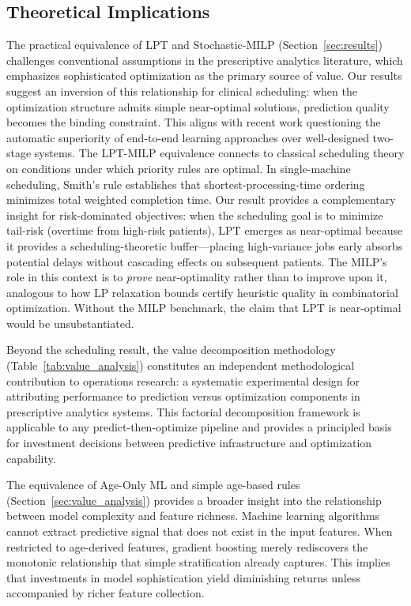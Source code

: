 \documentclass[11pt,a4paper]{article}
\begin{document}
\subsection{Theoretical Implications}

The practical equivalence of LPT and Stochastic-MILP (Section~\ref{sec:results}) challenges conventional assumptions in the prescriptive analytics literature, which emphasizes sophisticated optimization as the primary source of value. Our results suggest an inversion of this relationship for clinical scheduling: when the optimization structure admits simple near-optimal solutions, prediction quality becomes the binding constraint. This aligns with recent work questioning the automatic superiority of end-to-end learning approaches over well-designed two-stage systems. The LPT-MILP equivalence connects to classical scheduling theory on conditions under which priority rules are optimal. In single-machine scheduling, Smith's rule establishes that shortest-processing-time ordering minimizes total weighted completion time. Our result provides a complementary insight for risk-dominated objectives: when the scheduling goal is to minimize tail-risk (overtime from high-risk patients), LPT emerges as near-optimal because it provides a scheduling-theoretic buffer---placing high-variance jobs early absorbs potential delays without cascading effects on subsequent patients. The MILP's role in this context is to \textit{prove} near-optimality rather than to improve upon it, analogous to how LP relaxation bounds certify heuristic quality in combinatorial optimization. Without the MILP benchmark, the claim that LPT is near-optimal would be unsubstantiated.

Beyond the scheduling result, the value decomposition methodology (Table~\ref{tab:value_analysis}) constitutes an independent methodological contribution to operations research: a systematic experimental design for attributing performance to prediction versus optimization components in prescriptive analytics systems. This factorial decomposition framework is applicable to any predict-then-optimize pipeline and provides a principled basis for investment decisions between predictive infrastructure and optimization capability.

The equivalence of Age-Only ML and simple age-based rules (Section~\ref{sec:value_analysis}) provides a broader insight into the relationship between model complexity and feature richness. Machine learning algorithms cannot extract predictive signal that does not exist in the input features. When restricted to age-derived features, gradient boosting merely rediscovers the monotonic relationship that simple stratification already captures. This implies that investments in model sophistication yield diminishing returns unless accompanied by richer feature collection.
\end{document}
